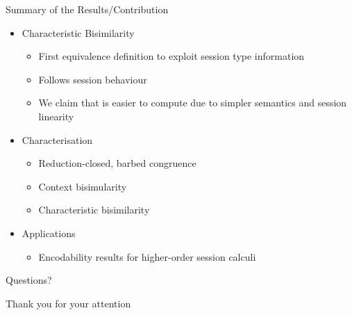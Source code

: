 \documentclass{beamer}
\begin{document}
	\begin{frame}{Summary of the Results/Contribution}
		\begin{itemize}
			\item	Characteristic Bisimilarity
				\begin{itemize}
					\item	First equivalence definition to exploit session type information
					\item	Follows session behaviour
					\item	We claim that is easier to compute due to simpler semantics and session linearity
				\end{itemize}

			\item	Characterisation
				\begin{itemize}
					\item	Reduction-closed, barbed congruence
					\item	Context bisimularity
					\item	Characteristic bisimilarity
				\end{itemize}

			\item	Applications
				\begin{itemize}
					\item	Encodability results for higher-order session calculi
				\end{itemize}

		\end{itemize}
	\end{frame}

	\begin{frame}{Questions?}
		\begin{center}
			\huge Thank you for your attention
		\end{center}
	\end{frame}
\end{document}
